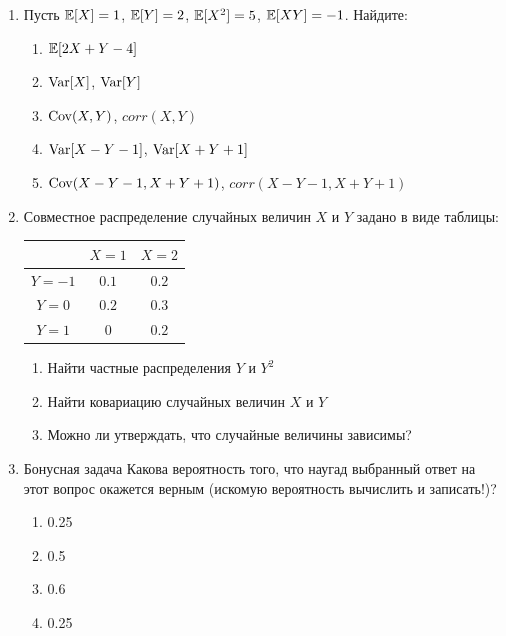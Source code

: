 \documentclass[12pt, a4paper]{article}\usepackage[]{graphicx}\usepackage[]{color}
\begin{document}
\begin{enumerate}
					\item Пусть $\mathbb{E} [X] = 1$, $\mathbb{E} [Y] = 2$, $\mathbb{E} [X^2] = 5$, $\mathbb{E}[XY] = -1$. Найдите:
					\begin{enumerate}
						\item $\mathbb{E} [2X + Y - 4]$
						\item $\operatorname{Var}[X]$, $\operatorname{Var}[Y]$
						\item $\operatorname{Cov}(X,Y)$, $corr(X,Y)$
						\item $\operatorname{Var}[X-Y-1]$,  $\operatorname{Var}[X+Y+1]$
						\item $\operatorname{Cov}(X-Y-1, X+Y+1)$,  $corr(X-Y-1, X+Y+1)$
					\end{enumerate}

					\item Совместное распределение случайных величин $X$ и $Y$ задано в виде таблицы:

					\begin{table}
						\begin{tabular}{|c|c|c|}
							\hline
							& $X=1$ & $X=2$ \\ \hline
							$Y=-1$ & $0.1$ & $0.2$ \\ \hline
							$Y=0$ & $0.2$ & $0.3$ \\ \hline
							$Y=1$ & $0$ & $0.2$ \\ \hline
						\end{tabular}
					\end{table}

					\begin{enumerate}
						\item Найти частные распределения $Y$ и $Y^2$
						\item Найти ковариацию случайных величин $X$ и $Y$
						\item Можно ли утверждать, что случайные величины зависимы?
					\end{enumerate}

					\item{Бонусная задача}
					Какова вероятность того, что наугад выбранный ответ на этот вопрос окажется верным (искомую вероятность вычислить и записать!)?
					\begin{enumerate}
						\item 0.25
						\item 0.5
						\item 0.6
						\item 0.25
					\end{enumerate}

				\end{enumerate}
\end{document}
